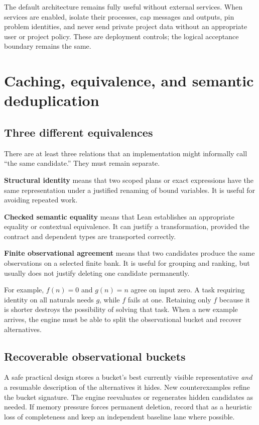 \documentclass[11pt,letterpaper]{article}
\theoremstyle{definition}
\theoremstyle{remark}
\begin{document}
The default architecture remains fully useful without external services. When services are enabled, isolate their processes, cap messages and outputs, pin problem identities, and never send private project data without an appropriate user or project policy. These are deployment controls; the logical acceptance boundary remains the same.

\section{Caching, equivalence, and semantic deduplication}
\label{sec:cache}

\subsection{Three different equivalences}

There are at least three relations that an implementation might informally call ``the same candidate.'' They must remain separate.

\textbf{Structural identity} means that two scoped plans or exact expressions have the same representation under a justified renaming of bound variables. It is useful for avoiding repeated work.

\textbf{Checked semantic equality} means that Lean establishes an appropriate equality or contextual equivalence. It can justify a transformation, provided the contract and dependent types are transported correctly.

\textbf{Finite observational agreement} means that two candidates produce the same observations on a selected finite bank. It is useful for grouping and ranking, but usually does not justify deleting one candidate permanently.

For example, $f(n)=0$ and $g(n)=n$ agree on input zero. A task requiring identity on all naturals needs $g$, while $f$ fails at one. Retaining only $f$ because it is shorter destroys the possibility of solving that task. When a new example arrives, the engine must be able to split the observational bucket and recover alternatives.

\subsection{Recoverable observational buckets}

A safe practical design stores a bucket's best currently visible representative \emph{and} a resumable description of the alternatives it hides. New counterexamples refine the bucket signature. The engine reevaluates or regenerates hidden candidates as needed. If memory pressure forces permanent deletion, record that as a heuristic loss of completeness and keep an independent baseline lane where possible.
\end{document}
